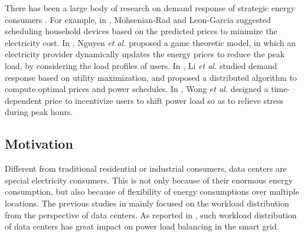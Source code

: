 \documentclass[journal]{IEEEtran}
\begin{document}
	There has been a large body of research on demand response of strategic energy consumers \cite{hamed1,han,lina,mung}. For example, in \cite{hamed1}, Mohsenian-Rad and Leon-Garcia suggested scheduling household devices based on the predicted prices to minimize the electricity cost. In \cite{han}, Nguyen \textit{et al.} proposed a game theoretic model, in which an electricity provider dynamically updates the energy prices to reduce the peak load, by considering the load profiles of users. In \cite{lina}, Li \textit{et al.} studied demand response based on utility maximization, and proposed a distributed algorithm to compute optimal prices and power schedules. In \cite{mung}, Wong \textit{et al.} designed a time-dependent price to incentivize users to shift power load so as to relieve stress during peak hours. 
	
	\subsection{Motivation}
	Different from traditional residential or industrial consumers, data centers are special electricity consumers. This is not only because of their enormous energy consumption, but also because of flexibility of energy consumptions over multiple locations. The previous studies in \cite{infocom,sigmetrics,online,SLA,price,Auction} mainly focused on the workload distribution from the perspective of data centers. As reported in \cite{tradeoff}, such workload distribution of data centers has great impact on power load balancing in the smart grid. 
		
\end{document}
